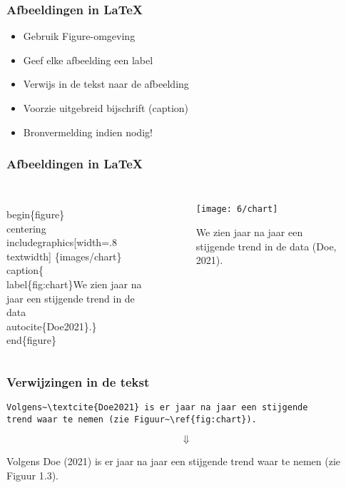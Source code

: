 \documentclass[aspectratio=169]{beamer}
\begin{document}
\begin{frame}
  \frametitle{Afbeeldingen in {\LaTeX}}

  \begin{itemize}
    \item Gebruik Figure-omgeving
    \item Geef elke afbeelding een label
    \item Verwijs in de tekst naar de afbeelding
    \item Voorzie uitgebreid bijschrift (caption)
    \item Bronvermelding indien nodig!
  \end{itemize}

\end{frame}

\begin{frame}
  \frametitle{Afbeeldingen in {\LaTeX}}

  \begin{columns}[c]

\begin{semiverbatim}
\small
\alert<1>{\\begin\{figure\}}
  \alert<2>{\\centering}
  \alert<3>{\\includegraphics[width=.8\\textwidth]
    \{images/chart\}}
  \alert<4>{\\caption\{\alert<5>{\\label\{fig:chart\}}We zien jaar
  na jaar een stijgende trend in
  de data \alert<6>{\\autocite\{Doe2021\}}.\}}
\alert<1>{\\end\{figure\}}
\end{semiverbatim}

    \begin{figure}
      \centering
      \texttt{[image: 6/chart]}
      \caption{\label{fig:chart}We zien jaar na jaar een stijgende trend in de data (Doe, 2021).}
    \end{figure}

  \end{columns}

\end{frame}

\begin{frame}[fragile]
  \frametitle{Verwijzingen in de tekst}

  \begin{verbatim}
Volgens~\textcite{Doe2021} is er jaar na jaar een stijgende
trend waar te nemen (zie Figuur~\ref{fig:chart}).
\end{verbatim}

  \[\Downarrow\]

  \bigskip

  Volgens Doe (2021) is er jaar na jaar een stijgende trend waar te nemen (zie Figuur 1.3).

\end{frame}
\end{document}
